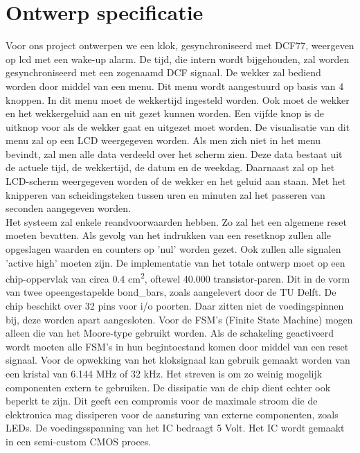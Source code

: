 \chapter{Ontwerp specificatie}
Voor ons project ontwerpen we een klok, gesynchroniseerd met DCF77, weergeven op lcd met een wake-up alarm. De tijd, die intern wordt bijgehouden, zal worden gesynchroniseerd met een zogenaamd DCF signaal. De wekker zal bediend worden door middel van een menu. Dit menu wordt aangestuurd op basis van 4 knoppen. In dit menu moet de wekkertijd ingesteld worden. Ook moet de wekker en het wekkergeluid aan en uit gezet kunnen worden. Een vijfde knop is de uitknop voor als de wekker gaat en uitgezet moet worden. De visualisatie van dit menu zal op een LCD weergegeven worden. Als men zich niet in het menu bevindt, zal men alle data verdeeld over het scherm zien. Deze data bestaat uit de actuele tijd, de wekkertijd, de datum en de weekdag. Daarnaast zal op het LCD-scherm weergegeven worden of de wekker en het geluid aan staan. Met het knipperen van scheidingsteken tussen uren en minuten zal het passeren van seconden aangegeven worden.\\

\noindent Het systeem zal enkele reandvoorwaarden hebben. Zo zal het een algemene reset moeten bevatten. Als gevolg van het indrukken van een resetknop zullen alle opgeslagen waarden en counters op 'nul' worden gezet. Ook zullen alle signalen 'active high' moeten zijn. De implementatie van het totale ontwerp moet op een chip-oppervlak van circa 0.4 cm\textsuperscript{2}, oftewel 40.000 transistor-paren. Dit in de vorm van twee opeengestapelde bond\_bars, zoals aangelevert door de TU Delft. De chip beschikt over 32 pins voor i/o poorten. Daar zitten niet de voedingspinnen bij, deze worden apart aangesloten. Voor de FSM’s (Finite State Machine) mogen alleen die van het Moore-type gebruikt worden. Als de schakeling geactiveerd wordt moeten alle FSM’s in hun begintoestand komen door middel van een reset signaal. Voor de opwekking van het kloksignaal kan gebruik gemaakt worden van een kristal van 6.144 MHz of 32 kHz. Het streven is om zo weinig mogelijk componenten extern te gebruiken. De dissipatie van de chip dient echter ook beperkt te zijn. Dit geeft een compromis voor de maximale stroom die de elektronica mag dissiperen voor de aansturing van externe componenten, zoals LEDs. De voedingsspanning van het IC bedraagt 5 Volt. Het IC wordt gemaakt in een semi-custom CMOS proces. ~\cite{handleiding}\\

